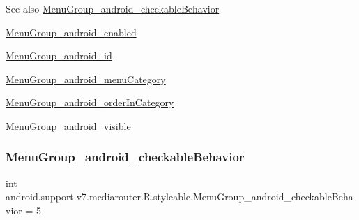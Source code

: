 \begin{DoxySeeAlso}{See also}
\hyperlink{classandroid_1_1support_1_1v7_1_1mediarouter_1_1R_1_1styleable_a7fc5c3225108078abc2996d8bedda93c}{Menu\+Group\+\_\+android\+\_\+checkable\+Behavior} 

\hyperlink{classandroid_1_1support_1_1v7_1_1mediarouter_1_1R_1_1styleable_a99b864f4e9d8c1343d9a229c4fafc1d8}{Menu\+Group\+\_\+android\+\_\+enabled} 

\hyperlink{classandroid_1_1support_1_1v7_1_1mediarouter_1_1R_1_1styleable_a29c4e10c0aeaf739d90a95589760567c}{Menu\+Group\+\_\+android\+\_\+id} 

\hyperlink{classandroid_1_1support_1_1v7_1_1mediarouter_1_1R_1_1styleable_aec7255225b161f1adf3fdde682b26d8c}{Menu\+Group\+\_\+android\+\_\+menu\+Category} 

\hyperlink{classandroid_1_1support_1_1v7_1_1mediarouter_1_1R_1_1styleable_a910908056e3ec8a81229d225d0bf0e5f}{Menu\+Group\+\_\+android\+\_\+order\+In\+Category} 

\hyperlink{classandroid_1_1support_1_1v7_1_1mediarouter_1_1R_1_1styleable_a3105b99a4ceb4bd3bba44b5de600fc44}{Menu\+Group\+\_\+android\+\_\+visible} 
\end{DoxySeeAlso}
\mbox{\label{classandroid_1_1support_1_1v7_1_1mediarouter_1_1R_1_1styleable_a7fc5c3225108078abc2996d8bedda93c}} 
\subsubsection{\texorpdfstring{Menu\+Group\+\_\+android\+\_\+checkable\+Behavior}{MenuGroup\_android\_checkableBehavior}}
{\footnotesize\ttfamily int android.\+support.\+v7.\+mediarouter.\+R.\+styleable.\+Menu\+Group\+\_\+android\+\_\+checkable\+Behavior = 5\hspace{0.3cm}{\ttfamily [static]}}

